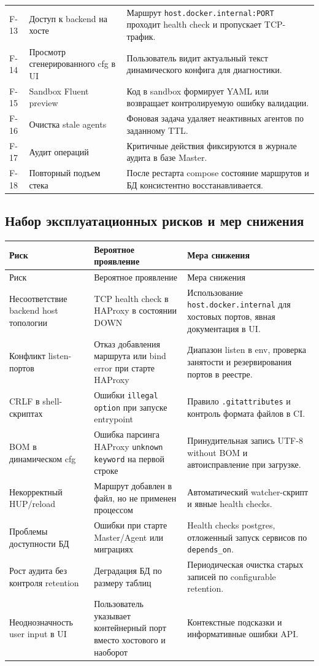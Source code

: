 \begin{longtable}{p{}p{}p{}}
F-13 & Доступ к backend на хосте & Маршрут \texttt{host.docker.internal:PORT} проходит health check и пропускает TCP-трафик. \\
F-14 & Просмотр сгенерированного cfg в UI & Пользователь видит актуальный текст динамического конфига для диагностики. \\
F-15 & Sandbox Fluent preview & Код в sandbox формирует YAML или возвращает контролируемую ошибку валидации. \\
F-16 & Очистка stale agents & Фоновая задача удаляет неактивных агентов по заданному TTL. \\
F-17 & Аудит операций & Критичные действия фиксируются в журнале аудита в базе Master. \\
F-18 & Повторный подъем стека & После рестарта compose состояние маршрутов и БД консистентно восстанавливается. \\
\bottomrule
\end{longtable}

\subsection{Набор эксплуатационных рисков и мер снижения}

\begin{longtable}{p{}p{}p{}}
\toprule
Риск & Вероятное проявление & Мера снижения \\
\midrule
\endfirsthead
\toprule
Риск & Вероятное проявление & Мера снижения \\
\midrule
\endhead
Несоответствие backend host топологии & TCP health check в HAProxy в состоянии DOWN & Использование \texttt{host.docker.internal} для хостовых портов, явная документация в UI. \\
Конфликт listen-портов & Отказ добавления маршрута или bind error при старте HAProxy & Диапазон listen в env, проверка занятости и резервирования портов в реестре. \\
CRLF в shell-скриптах & Ошибки \texttt{illegal option} при запуске entrypoint & Правило \texttt{.gitattributes} и контроль формата файлов в CI. \\
BOM в динамическом cfg & Ошибка парсинга HAProxy \texttt{unknown keyword} на первой строке & Принудительная запись UTF-8 without BOM и автоисправление при загрузке. \\
Некорректный HUP/reload & Маршрут добавлен в файл, но не применен процессом & Автоматический watcher-скрипт и явные health checks. \\
Проблемы доступности БД & Ошибки при старте Master/Agent или миграциях & Health checks postgres, отложенный запуск сервисов по \texttt{depends\_on}. \\
Рост аудита без контроля retention & Деградация БД по размеру таблиц & Периодическая очистка старых записей по configurable retention. \\
Неоднозначность user input в UI & Пользователь указывает контейнерный порт вместо хостового и наоборот & Контекстные подсказки и информативные ошибки API. \\
\bottomrule
\end{longtable}

